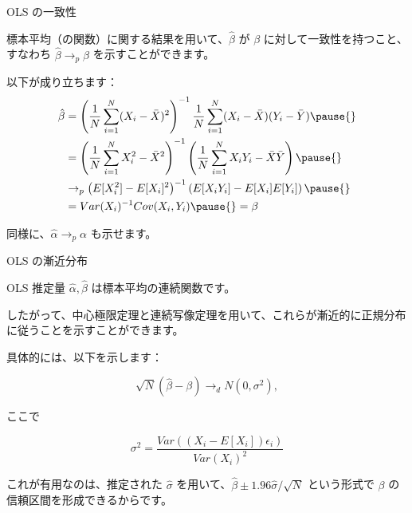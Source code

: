 \documentclass[11pt,handout]{beamer}
\newenvironment{wideitemize}{\itemize\addtolength{\itemsep}{10pt}}{\enditemize}
\begin{document}
\begin{frame}{OLS の一致性}
\begin{wideitemize}
\item
標本平均（の関数）に関する結果を用いて、$\hat\beta$ が $\beta$ に対して一致性を持つこと、すなわち $\hat\beta \rightarrow_p \beta$ を示すことができます。

\pause
\item
以下が成り立ちます：
\begin{align*}
 \hat\beta &=\left( \frac{1}{N} \sum_{i=1}^N (X_i - \bar{X})^2 \right)^{-1}   \frac{1}{N} \sum_{i=1}^{N} (X_i - \bar{X})(Y_i - \bar{Y}) \pause{}  \\
 &= \left( \frac{1}{N} \sum_{i=1}^N X_i^2 - \bar{X}^2 \right)^{-1}   \left( \frac{1}{N} \sum_{i=1}^{N} X_i Y_i - \bar{X} \bar{Y} \right) \pause{} \\
 & \rightarrow_p \left( E[X_i^2] - E[X_i]^2 \right)^{-1}   \left( E[X_i Y_i] - E[X_i] E[Y_i] \right) \pause{} \\
 &= Var(X_i)^{-1} Cov(X_i, Y_i) \pause{} = \beta
\end{align*}


\pause
\item
同様に、$\hat\alpha \rightarrow_p \alpha$ も示せます。
\end{wideitemize}		
\end{frame}


\begin{frame}{OLS の漸近分布}
	\begin{wideitemize}
	\item
	OLS 推定量 $\hat\alpha, \hat\beta$ は標本平均の連続関数です。
	
	\pause
	\item
	したがって、中心極限定理と連続写像定理を用いて、これらが漸近的に正規分布に従うことを示すことができます。
	
	\pause
	\item
	具体的には、以下を示します：
	
		$$\sqrt{N}(\hat\beta - \beta) \rightarrow_d N(0, \sigma^2),$$
	
	\noindent ここで
	
	$$\sigma^2 = \dfrac{  Var((X_i - E[X_i])\epsilon_i) }{ Var(X_i)^2  }$$ 
	
	
	\pause
	\item
	これが有用なのは、推定された $\hat\sigma$ を用いて、$\hat\beta \pm 1.96 \hat\sigma / \sqrt{N}$ という形式で $\beta$ の信頼区間を形成できるからです。
	
	\end{wideitemize}	
\end{frame}
\end{document}
